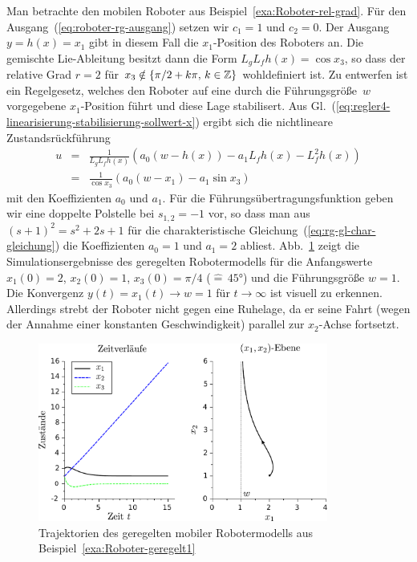 \begin{example}
\label{exa:Roboter-geregelt1}Man betrachte den mobilen Roboter aus
Beispiel~\ref{exa:Roboter-rel-grad}. Für den Ausgang~(\ref{eq:roboter-rg-ausgang})
setzen wir $c_{1}=1$ und $c_{2}=0$. Der Ausgang $y=h(x)=x_{1}$
gibt in diesem Fall die $x_{1}$-Position des Roboters an. Die gemischte
Lie-Ableitung besitzt dann die Form $L_{g}L_{f}h(x)=\cos x_{3}$,
so dass der relative Grad $r=2$ für $x_{3}\notin\{\pi/2+k\pi,\,k\in{\mathbb{Z}}\}$
wohldefiniert ist. Zu entwerfen ist ein Regelgesetz, welches den Roboter
auf eine durch die Führungsgröße~$w$ vorgegebene $x_{1}$-Position
führt und diese Lage stabilisert. Aus Gl.~(\ref{eq:regler4-linearisierung-stabilisierung-sollwert-x})
ergibt sich die nichtlineare Zustandsrückführung 
\begin{eqnarray*}
u & = & \frac{1}{L_{g}L_{f}h(x)}\left(a_{0}\left(w-h(x)\right)-a_{1}L_{f}h(x)-L_{f}^{2}h(x)\right)\\
 & = & \frac{1}{\cos x_{3}}\left(a_{0}(w-x_{1})-a_{1}\sin x_{3}\right)
\end{eqnarray*}
mit den Koeffizienten $a_{0}$ und $a_{1}$. Für die Führungsübertragungsfunktion
geben wir eine doppelte Polstelle bei $s_{1,2}=-1$ vor, so dass man
aus $(s+1)^{2}=s^{2}+2s+1$ für die charakteristische Gleichung~(\ref{eq:rg-gl-char-gleichung})
die Koeffizienten $a_{0}=1$ und $a_{1}=2$ abliest. Abb.~\ref{fig:Roboter-geregelt1}
zeigt die Simulationsergebnisse des geregelten Robotermodells für
die Anfangswerte $x_{1}(0)=2$, $x_{2}(0)=1$, $x_{3}(0)=\pi/4$ ($\widehat{=}\,45\text{°}$)
und die Führungsgröße $w=1$. Die Konvergenz $y(t)=x_{1}(t)\to w=1$
für $t\to\infty$ ist visuell zu erkennen. Allerdings strebt der Roboter
nicht gegen eine Ruhelage, da er seine Fahrt (wegen der Annahme einer
konstanten Geschwindigkeit) parallel zur $x_{2}$-Achse fortsetzt.
\end{example}
\begin{figure}
\begin{centering}
\includegraphics[width=0.85\textwidth]{robot_lin}
\par\end{centering}
\caption{Trajektorien des geregelten mobiler Robotermodells aus Beispiel~\ref{exa:Roboter-geregelt1}\label{fig:Roboter-geregelt1}}
\end{figure}

